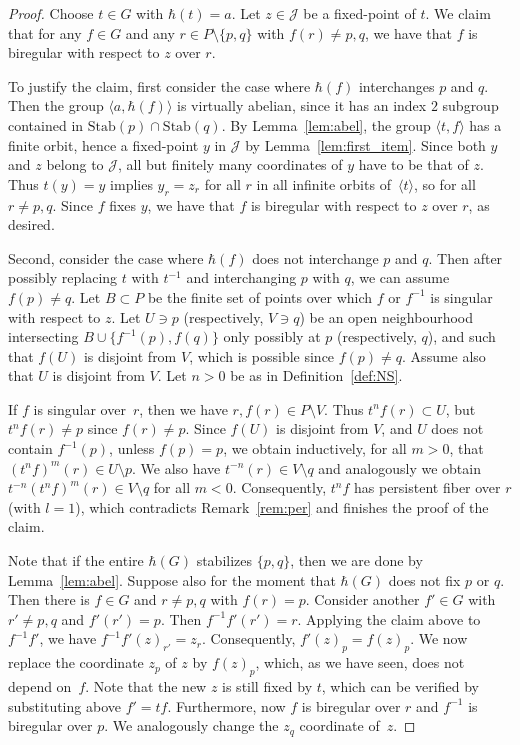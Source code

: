 \documentclass[JEP,XML,SOM,Unicode, NoEqCountersInSection,published]{cedram}
\newcommand{\Jon}{\mathscr{J}}
\theoremstyle{plain}
\theoremstyle{definition}
\begin{document}
\begin{proof}
Choose $t\in G$ with $\hbar(t)=a$. Let $z\in \Jon$ be a fixed-point of $t$. We claim that for any $f\in G$ and any $r\in P\setminus \{p,q\}$ with $f(r)\neq p,q$, we have that $f$ is biregular with respect to $z$ over $r$.

To justify the claim, first consider the case where $\hbar(f)$ interchanges $p$ and $q$. Then the group $\langle a, \hbar(f)\rangle$ is virtually abelian, {since it has an index $2$ subgroup contained in $\mathrm{Stab}(p)\cap\mathrm{Stab}(q)$}. By Lemma~\ref{lem:abel}, the group $\langle t,f\rangle$ has a finite orbit, hence a fixed-point $y$ in $\Jon$ by Lemma~\ref{lem:first_item}. {Since both $y$ and $z$ belong to $\Jon$}, all but finitely many coordinates of $y$ have to be that of $z$. {Thus} $t(y)=y$ implies $y_r=z_r$ for all $r$ in all infinite orbits of~$\langle t\rangle$, so for all $r\neq p,q$. Since $f$ fixes $y$, we have that $f$ is biregular with respect to $z$ over $r$, as desired.

Second, consider the case where $\hbar(f)$ does not interchange $p$ and $q$. Then after possibly replacing $t$ with $t^{-1}$ and interchanging $p$ with $q$, we can assume $f(p)\neq q$. Let $B\subset P$ be the finite set of points over which $f$ or $f^{-1}$ is singular with respect to $z$. Let $U\ni p$ (respectively, $V\ni q$) be an open neighbourhood intersecting $B\cup \{f^{-1}(p),f(q)\}$ only possibly at $p$ (respectively, $q$), and such that $f(U)$ is disjoint from $V$, which is possible since $f(p)\neq q$.
{Assume also that $U$ is disjoint from $V$.}
Let $n>0$ be as in Definition~\ref{def:NS}.

If $f$ is singular over~$r$, then we have $r,f(r)\in P\setminus V$. Thus $t^nf(r)\subset U$, but $t^nf(r)\neq p$ since $f(r)\neq p$.
Since $f(U)$ is disjoint from $V$, and $U$ does not contain $f^{-1}(p)$, unless $f(p)=p$, we obtain inductively, for all $m>0$, that $(t^nf)^m(r)\in U\setminus p$. We also have $t^{-n}(r)\in V\setminus q$ and analogously we obtain $t^{-n}(t^nf)^m(r)\in V\setminus q$ for all $m<0$. Consequently, $t^nf$ has persistent fiber over $r$ (with $l=1$), which contradicts Remark~\ref{rem:per} and finishes the proof of the claim.

Note that if the entire $\hbar(G)$ stabilizes $\{p,q\}$, then we are done by Lemma~\ref{lem:abel}. Suppose also for the moment that $\hbar(G)$ does not {fix} $p$ or $q$. Then there is $f\in G$ and $r\neq p,q$ with $f(r)=p$. Consider another $f'\in G$ with $r'\neq p,q$ and $f'(r')=p$. Then $f^{-1}f'(r')=r$. Applying the claim above to $f^{-1}f'$, we have $f^{-1}f'(z)_{r'}= z_{r}$. Consequently, $f'(z)_{p}= f(z)_{p}$. We now replace the coordinate $z_p$ of $z$ by $f(z)_{p}$, which, as we have seen, does not depend on~$f$. Note that the new $z$ is still fixed by $t$, which can be verified by substituting above $f'=tf$. Furthermore, now $f$ is biregular over $r$ and $f^{-1}$ is biregular over $p$.
We analogously change the $z_q$ coordinate of~$z$.


\end{proof}
\end{document}
